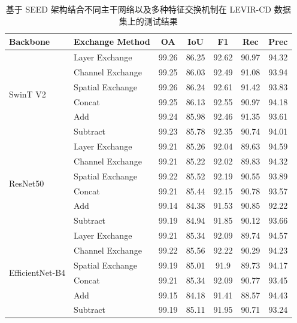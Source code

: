 \begin{table}[!htbp]
\centering
\caption{基于 SEED 架构结合不同主干网络以及多种特征交换机制在 LEVIR-CD 数据集上的测试结果}
\label{tab:seed_levir_backbone}
\begin{tabular}{l l c c c c c}
\hline
\textbf{Backbone} & \textbf{Exchange Method} & \textbf{OA} & \textbf{IoU} & \textbf{F1} & \textbf{Rec} & \textbf{Prec} \\
\hline
\multirow{6}{*}{SwinT V2} 
 & Layer Exchange    & 99.26 & 86.25 & 92.62 & 90.97 & 94.32 \\
 & Channel Exchange  & 99.25 & 86.03 & 92.49 & 91.08 & 93.94 \\
 & Spatial Exchange  & 99.26 & 86.24 & 92.61 & 91.42 & 93.83 \\
\cline{2-7}
 & Concat            & 99.25 & 86.13 & 92.55 & 90.97 & 94.18 \\
 & Add               & 99.24 & 85.98 & 92.46 & 91.35 & 93.61 \\
 & Subtract             & 99.23 & 85.78 & 92.35 & 90.74 & 94.01 \\
\hline
\multirow{6}{*}{ResNet50} 
 & Layer Exchange    & 99.21 & 85.26 & 92.04 & 89.63 & 94.59 \\ 
 & Channel Exchange  & 99.21 & 85.22 & 92.02 & 89.83 & 94.32 \\
 & Spatial Exchange  & 99.22 & 85.52 & 92.19 & 90.55 & 93.89 \\    %
\cline{2-7}
 & Concat            & 99.21 & 85.44 & 92.15 & 90.78 & 93.57 \\    %
 & Add               & 99.14 & 84.38 & 91.53 & 90.85 & 92.22 \\
 & Subtract             & 99.19 & 84.94 & 91.85 & 90.12 & 93.66 \\
\hline
\multirow{6}{*}{EfficientNet-B4} 
 & Layer Exchange    & 99.21 & 85.34  & 92.09 & 89.74 & 94.57 \\
 & Channel Exchange  & 99.22 & 85.56	& 92.22	& 90.29	& 94.23 \\
 & Spatial Exchange  & 99.19 & 85.01	& 91.9	& 89.73	& 94.17 \\
\cline{2-7}
 & Concat            & 99.21	& 85.34	& 92.09	& 90.77	& 93.45 \\
 & Add               & 99.15	& 84.18	& 91.41	& 88.57	& 94.43 \\
 & Subtract             & 99.19	& 85.11	& 91.95	& 90.71	& 93.24 \\
\hline
\end{tabular}
\end{table}

